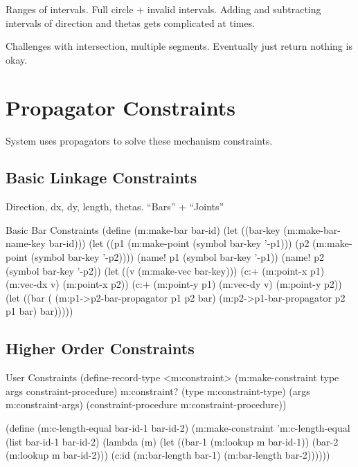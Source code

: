 Ranges of intervals. Full circle + invalid intervals. Adding and
subtracting intervals of direction and thetas gets complicated at times.

Challenges with intersection, multiple segments. Eventually just
return nothing is okay.

\section{Propagator Constraints}

System uses propagators to solve these mechanism constraints.

\subsection{Basic Linkage Constraints}

Direction, dx, dy, length, thetas. ``Bars'' + ``Joints''

\begin{code-listing}{Basic Bar Constraints}
(define (m:make-bar bar-id)
  (let ((bar-key (m:make-bar-name-key bar-id)))
    (let ((p1 (m:make-point (symbol bar-key '-p1)))
          (p2 (m:make-point (symbol bar-key '-p2))))
      (name! p1 (symbol bar-key '-p1))
      (name! p2 (symbol bar-key '-p2))
      (let ((v (m:make-vec bar-key)))
        (c:+ (m:point-x p1)
             (m:vec-dx v)
             (m:point-x p2))
        (c:+ (m:point-y p1)
             (m:vec-dy v)
             (m:point-y p2))
        (let ((bar (%
          (m:p1->p2-bar-propagator p1 p2 bar)
          (m:p2->p1-bar-propagator p2 p1 bar)
          bar)))))
\end{code-listing}

\subsection{Higher Order Constraints}

\begin{code-listing}{User Constraints}
(define-record-type <m:constraint>
  (m:make-constraint type args constraint-procedure)
  m:constraint?
  (type m:constraint-type)
  (args m:constraint-args)
  (constraint-procedure m:constraint-procedure))

(define (m:c-length-equal bar-id-1 bar-id-2)
  (m:make-constraint
   'm:c-length-equal
   (list bar-id-1 bar-id-2)
   (lambda (m)
     (let ((bar-1 (m:lookup m bar-id-1))
           (bar-2 (m:lookup m bar-id-2)))
       (c:id
        (m:bar-length bar-1)
        (m:bar-length bar-2))))))
\end{code-listing}

